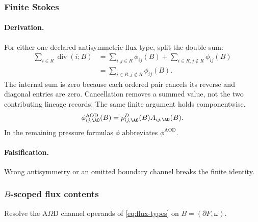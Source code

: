 \subsubsection{Finite Stokes}
\paragraph{Derivation.}
For either one declared antisymmetric flux type, split the double sum:
\begin{equation}
\begin{split}
\sum_{i\in R}\operatorname{div}(i;B)
&=\sum_{i,j\in R}\phi_{ij}(B)+\sum_{i\in R,j\notin R}\phi_{ij}(B)\\
&=\sum_{i\in R,j\notin R}\phi_{ij}(B).
\end{split}
\label{eq:afc-stokes-used}
\end{equation}
The internal sum is zero because each ordered pair cancels its reverse and
diagonal entries are zero. Cancellation removes a summed value, not the
two contributing lineage records. The same finite argument holds componentwise.
\begin{equation}
\phi^{\mathrm{AOD}}_{ij,\AO}(B)=p^D_{ij,\AO}(B)A_{ij,\AO}(B).
\label{eq:afc-flux-ao-resolution}
\end{equation}
In the remaining pressure formulas \(\phi\) abbreviates \(\phi^{\mathrm{AOD}}\).
\paragraph{Falsification.} Wrong antisymmetry or an omitted boundary channel
breaks the finite identity.

\subsubsection{\texorpdfstring{\(B\)-scoped flux contents}{B-scoped flux contents}}\label{subsec:b-scoped-flux-contents}
Resolve the A\(\Omega\)D channel operands of \eqref{eq:flux-types} on
\(B=(\partial F,\omega)\).

